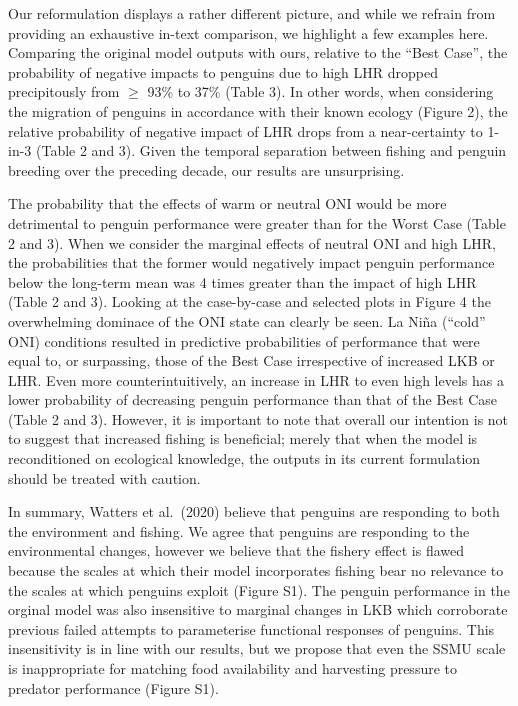 \documentclass[]{elsarticle} %
\begin{document}
Our reformulation displays a rather different picture, and while we
refrain from providing an exhaustive in-text comparison, we highlight a
few examples here. Comparing the original model outputs with ours,
relative to the ``Best Case'', the probability of negative impacts to
penguins due to high LHR dropped precipitously from \(\geqslant\) 93\%
to 37\% (Table 3). In other words, when considering the migration of
penguins in accordance with their known ecology (Figure 2), the relative
probability of negative impact of LHR drops from a near-certainty to
1-in-3 (Table 2 and 3). Given the temporal separation between fishing
and penguin breeding over the preceding decade, our results are
unsurprising.

The probability that the effects of warm or neutral ONI would be more
detrimental to penguin performance were greater than for the Worst Case
(Table 2 and 3). When we consider the marginal effects of neutral ONI
and high LHR, the probabilities that the former would negatively impact
penguin performance below the long-term mean was 4 times greater than
the impact of high LHR (Table 2 and 3). Looking at the case-by-case and
selected plots in Figure 4 the overwhelming dominace of the ONI state
can clearly be seen. La Niña (``cold'' ONI) conditions resulted in
predictive probabilities of performance that were equal to, or
surpassing, those of the Best Case irrespective of increased LKB or LHR.
Even more counterintuitively, an increase in LHR to even high levels has
a lower probability of decreasing penguin performance than that of the
Best Case (Table 2 and 3). However, it is important to note that overall
our intention is not to suggest that increased fishing is beneficial;
merely that when the model is reconditioned on ecological knowledge, the
outputs in its current formulation should be treated with caution.

In summary, Watters et al.~(2020) believe that penguins are responding
to both the environment and fishing. We agree that penguins are
responding to the environmental changes, however we believe that the
fishery effect is flawed because the scales at which their model
incorporates fishing bear no relevance to the scales at which penguins
exploit (Figure S1). The penguin performance in the orginal model was
also insensitive to marginal changes in LKB which corroborate previous
failed attempts to parameterise functional responses of penguins. This
insensitivity is in line with our results, but we propose that even the
SSMU scale is inappropriate for matching food availability and
harvesting pressure to predator performance (Figure S1).
\end{document}
